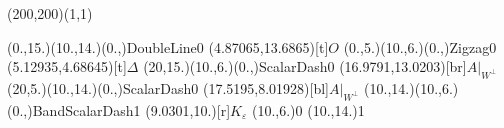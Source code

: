 \unitlength=1bp%

\begin{feynartspicture}(200,200)(1,1)

\FADiagram{}
\FAProp(0.,15.)(10.,14.)(0.,){DoubleLine}{0}
\FALabel(4.87065,13.6865)[t]{$O$}
\FAProp(0.,5.)(10.,6.)(0.,){Zigzag}{0}
\FALabel(5.12935,4.68645)[t]{$\Delta$}
\FAProp(20,15.)(10.,6.)(0.,){ScalarDash}{0}
\FALabel(16.9791,13.0203)[br]{$A|_{W^\perp}$}
\FAProp(20,5.)(10.,14.)(0.,){ScalarDash}{0}
\FALabel(17.5195,8.01928)[bl]{$A|_{W^\perp}$}
\FAProp(10.,14.)(10.,6.)(0.,){BandScalarDash}{1}
\FALabel(9.0301,10.)[r]{$K_\varepsilon$}
\FAVert(10.,6.){0}
\FAVert(10.,14.){1}
\end{feynartspicture}

